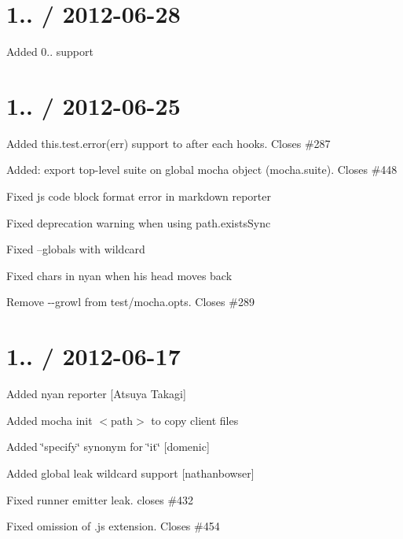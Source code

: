 \section*{1.. / 2012-\/06-\/28}


\begin{DoxyItemize}
\item Added 0.. support
\end{DoxyItemize}

\section*{1.. / 2012-\/06-\/25}


\begin{DoxyItemize}
\item Added {\ttfamily this.\+test.\+error(err)} support to after each hooks. Closes \#287
\item Added\+: export top-\/level suite on global mocha object (mocha.\+suite). Closes \#448
\item Fixed {\ttfamily js} code block format error in markdown reporter
\item Fixed deprecation warning when using {\ttfamily path.\+exists\+Sync}
\item Fixed --globals with wildcard
\item Fixed chars in nyan when his head moves back
\item Remove {\ttfamily -\/-\/growl} from test/mocha.\+opts. Closes \#289
\end{DoxyItemize}

\section*{1.. / 2012-\/06-\/17}


\begin{DoxyItemize}
\item Added {\ttfamily nyan} reporter \mbox{[}Atsuya Takagi\mbox{]}
\item Added {\ttfamily mocha init $<$path$>$} to copy client files
\item Added \char`\"{}specify\char`\"{} synonym for \char`\"{}it\char`\"{} \mbox{[}domenic\mbox{]}
\item Added global leak wildcard support \mbox{[}nathanbowser\mbox{]}
\item Fixed runner emitter leak. closes \#432
\item Fixed omission of .js extension. Closes \#454
\end{DoxyItemize}

